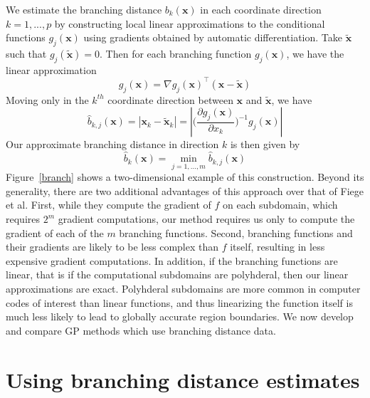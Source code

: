 \documentclass{article}
\newcommand{\abs}[1]{\left|#1\right|}
\renewcommand{\vec}[1]{\mathbf{#1}}
\begin{document}
We estimate the branching distance $b_k(\vec{x})$ in each coordinate direction $k=1,...,p$ by constructing local linear approximations to the conditional functions $g_j(\vec{x})$ using gradients obtained by automatic differentiation. Take $\tilde{\vec{x}}$ such that $g_j(\tilde{\vec{x}}) = 0$. Then for each branching function $g_j(\vec{x})$, we have the linear approximation
$$ g_j(\vec{x}) = \nabla g_j(\vec{x})^\top (\vec{x} - \tilde{\vec{x}}) $$
Moving only in the $k^{th}$ coordinate direction between $\vec{x}$ and $\tilde{\vec{x}}$, we have
$$ \hat{b}_{k,j}(\vec{x}) = \abs{\vec{x}_k - \tilde{\vec{x}}_k} = \abs{\bigg(\frac{\partial g_j(\vec{x})}{\partial x_k}\bigg)^{-1} g_j(\vec{x})} $$
Our approximate branching distance in direction $k$ is then given by
$$ \hat{b}_k(\vec{x}) = \min_{j=1,...,m} \hat{b}_{k,j}(\vec{x}) $$
Figure~\ref{branch} shows a two-dimensional example of this construction. Beyond its generality, there are two additional advantages of this approach over that of Fiege et al. First, while they compute the gradient of $f$ on each subdomain, which requires $2^m$ gradient computations, our method requires us only to compute the gradient of each of the $m$ branching functions. Second, branching functions and their gradients are likely to be less complex than $f$ itself, resulting in less expensive gradient computations. In addition, if the branching functions are linear, that is if the computational subdomains are polyhderal, then our linear approximations are exact. Polyhderal subdomains are more common in computer codes of interest than linear functions, and thus linearizing the function itself is much less likely to lead to globally accurate region boundaries. We now develop and compare GP methods which use branching distance data.

\section{Using branching distance estimates} \label{using_branch}
\end{document}
